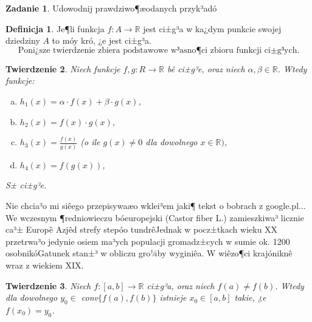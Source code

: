 \documentclass[12pt,a4paper]{article}
\newtheorem{tw}{Twierdzenie}[section]
\theoremstyle{definition}
\newtheorem{df}[tw]{Definicja}
\newtheorem{zad}{Zadanie}
\begin{document}
\begin{zad}
Udowodnij prawdziwo¶æodanych przyk³adó\end{zad}

\begin{df}
Je¶li funkcja $f: A \rightarrow  \mathbb{R}$ jest ci±g³a w ka¿dym punkcie swojej dziedziny $A$ to móy kró, ¿e jest ci±g³a.
\[ \mbox{Poni¿sze twierdzenie zbiera podstawowe w³asno¶ci zbioru funkcji ci±g³ych.} \]
\end{df}

\begin{tw}
Niech funkcje $f, g: R \rightarrow  \mathbb{R}$ bê ci±g³e, oraz niech $\alpha , \beta  \in  \mathbb{R}$. Wtedy funkcje:
\begin{enumerate}[a)]
\item $h_1(x) = \alpha  \cdot  f(x) + \beta  \cdot  g(x)$,
\item $h_2(x) = f(x) \cdot  g(x)$,
\item $h_3(x) = \frac{f(x)}{g(x)}$ (o ile $g(x) \ne  0$ dla dowolnego $x \in \mathbb{R})$,
\item $h_4(x) = f(g(x))$,
\end{enumerate}
S± ci±g³e.
\end{tw}

Nie chcia³o mi siêego przepisywaæo wklei³em jaki¶ tekst o bobrach z google.pl... We wczesnym ¶redniowieczu bóeuropejski (Castor fiber L.) zamieszkiwa³ licznie ca³± Europê Azjêd strefy stepóo tundrêJednak w pocz±tkach wieku XX przetrwa³o jedynie osiem ma³ych populacji gromadz±cych w sumie ok. 1200 osobnikóGatunek stan±³ w obliczu gro¼by wyginiêa. W wiêzo¶ci krajóniknê wraz z wiekiem XIX.

\begin{tw}
Niech $f: [a,b] \rightarrow  \mathbb{R}$ ci±g³a, oraz niech $f(a) \ne  f(b)$. Wtedy dla dowolnego $y_0 \in $ conv$\{f(a),f(b)\}$ istnieje $x_0 \in  [a,b]$ takie, ¿e $f(x_0) = y_0$.
\end{tw}
\end{document}
